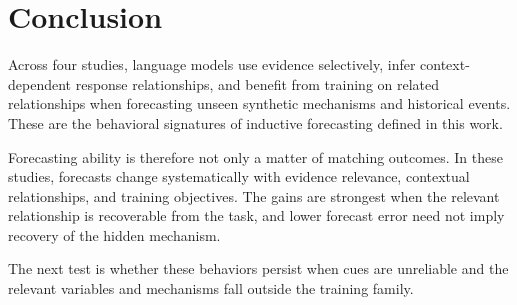 \section{Conclusion}

Across four studies, language models use evidence selectively, infer
context-dependent response relationships, and benefit from training on related
relationships when forecasting unseen synthetic mechanisms and historical events.
These are the behavioral signatures of inductive forecasting defined in this work.

Forecasting ability is therefore not only a matter of matching outcomes. In these
studies, forecasts change systematically with evidence relevance, contextual
relationships, and training objectives. The gains are strongest when the relevant
relationship is recoverable from the task, and lower forecast error need not imply
recovery of the hidden mechanism.

The next test is whether these behaviors persist when cues are unreliable and the
relevant variables and mechanisms fall outside the training family.
